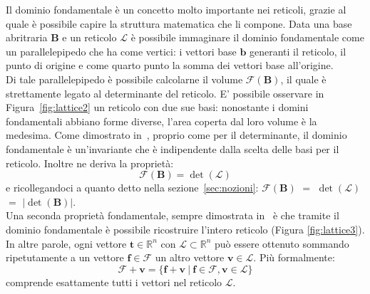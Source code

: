 Il dominio fondamentale è un concetto molto importante nei reticoli, grazie al quale è possibile
capire la struttura matematica che li compone. Data una base abritraria $\mathbf{B}$ e un reticolo 
$\mathcal{L}$ è possibile immaginare il dominio fondamentale come un parallelepipedo 
che ha come vertici: i vettori base $\mathbf{b}$ generanti il reticolo, il punto di origine e 
come quarto punto la somma dei vettori base all'origine. \\
Di tale parallelepipedo è possibile calcolarne il volume $\mathcal{F}(\mathbf{B})$, il 
quale è strettamente legato al determinante del reticolo. 
E' possibile osservare in Figura~\ref{fig:lattice2} un reticolo con due sue basi: nonostante 
i domini fondamentali abbiano forme diverse, l'area coperta dal loro volume è la medesima.
Come dimostrato in~\cite[sezione 7.4]{HDMRD08}, proprio come per il
determinante, il dominio fondamentale è un'invariante che è indipendente dalla scelta 
delle basi per il reticolo. Inoltre ne deriva la proprietà:
\[
    \mathcal{F}(\mathbf{B}) = \det(\mathcal{L})
\]
e ricollegandoci a quanto detto nella sezione~\ref{sec:nozioni}: 
$\mathcal{F}(\mathbf{B})$ $=$ $\det(\mathcal{L})$ $=$ $|\det(\mathbf{B})|$.\\
Una seconda proprietà fondamentale, sempre dimostrata in~\cite{HDMRD08} è che tramite il
dominio fondamentale è possibile ricostruire l'intero reticolo (Figura \ref{fig:lattice3}). 
In altre parole, ogni vettore $\mathbf{t} \in \mathbb{R}^n$ con $\mathcal{L} \subset \mathbb{R}^n $ 
può essere ottenuto sommando ripetutamente a un vettore $\mathbf{f} \in \mathcal{F}$ un 
altro vettore $\mathbf{v} \in \mathcal{L}$.
Più formalmente: 
\[
    \mathcal{F} + \mathbf{v} = 
\{ 
    \mathbf{f} + \mathbf{v} \ | \ \mathbf{f} \in \mathcal{F}, \mathbf{v} \in \mathcal{L}
\} 
\]
comprende esattamente tutti i vettori nel reticolo $\mathcal{L}$.

